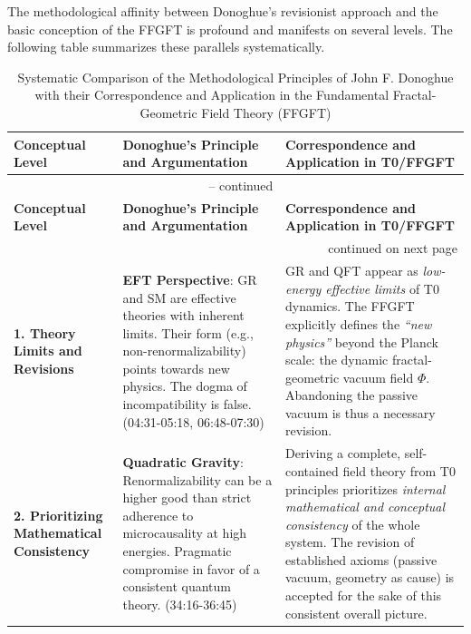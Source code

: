 	
	The methodological affinity between Donoghue's revisionist approach and the basic conception of the FFGFT is profound and manifests on several levels. The following table summarizes these parallels systematically.
	
	\begin{longtable}{p{} p{} p{}}
		\caption{Systematic Comparison of the Methodological Principles of John F. Donoghue with their Correspondence and Application in the Fundamental Fractal-Geometric Field Theory (FFGFT)} \\
		\toprule
		\textbf{Conceptual Level} & \textbf{Donoghue's Principle and Argumentation} & \textbf{Correspondence and Application in T0/FFGFT} \\
		\midrule
		\endfirsthead
		
		\multicolumn{3}{c}{{\tablename\ \thetable{} -- continued}} \\
		\toprule
		\textbf{Conceptual Level} & \textbf{Donoghue's Principle and Argumentation} & \textbf{Correspondence and Application in T0/FFGFT} \\
		\midrule
		\endhead
		
		\midrule \multicolumn{3}{r}{{continued on next page}} \\
		\endfoot
		
		\bottomrule
		\endlastfoot
		\textbf{1. Theory Limits and Revisions} & 
		\textbf{EFT Perspective}: GR and SM are effective theories with inherent limits. Their form (e.g., non-renormalizability) points towards new physics. The dogma of incompatibility is false. \cite{DonoghueInterview2025} (04:31-05:18, 06:48-07:30) & 
		GR and QFT appear as \emph{low-energy effective limits} of T0 dynamics. The FFGFT explicitly defines the \emph{``new physics''} beyond the Planck scale: the dynamic fractal-geometric vacuum field $\Phi$. Abandoning the passive vacuum is thus a necessary revision. \\
		\midrule
		
		\textbf{2. Prioritizing Mathematical Consistency} & 
		\textbf{Quadratic Gravity}: Renormalizability can be a higher good than strict adherence to microcausality at high energies. Pragmatic compromise in favor of a consistent quantum theory. \cite{DonoghueInterview2025} (34:16-36:45) & 
		Deriving a complete, self-contained field theory from T0 principles prioritizes \emph{internal mathematical and conceptual consistency} of the whole system. The revision of established axioms (passive vacuum, geometry as cause) is accepted for the sake of this consistent overall picture. \\
		\midrule
		

\end{longtable}
